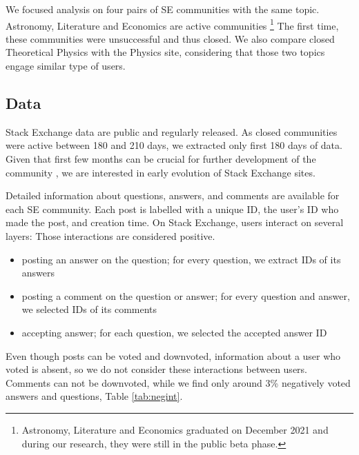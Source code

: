 We focused analysis on four pairs of SE communities with the same topic. Astronomy, Literature and Economics are active communities \footnote{Astronomy, Literature and Economics graduated on December 2021 and during our research, they were still in the public beta phase.} The first time, these communities were unsuccessful and thus closed. We also compare closed Theoretical Physics with the Physics site, considering that those two topics engage similar type of users.

\subsection{Data}
Stack Exchange data are public and regularly released. As closed communities were active between 180 and 210 days, we extracted only first 180 days of data. Given that first few months can be crucial for further development of the community \cite{dover2020sustainable}, we are interested in early evolution of Stack Exchange sites. 

Detailed information about questions, answers, and comments are available for each SE community. Each post is labelled with a unique ID, the user's ID who made the post, and creation time. On Stack Exchange, users interact on several layers: Those interactions are considered positive.
\begin{itemize}
	\item posting an answer on the question; for every question, we extract IDs of its answers
	\item posting a comment on the question or answer; for every question and answer, we selected IDs of its comments
	\item accepting answer; for each question, we selected the accepted answer ID
\end{itemize}

Even though posts can be voted and downvoted, information about a user who voted is absent, so we do not consider these interactions between users. Comments can not be downvoted, while we find only around 3\% negatively voted answers and questions, Table \ref{tab:negint}.

